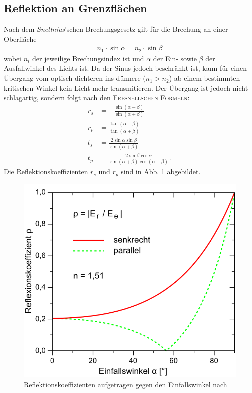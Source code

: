 \documentclass[12pt,a4paper,titlepage,headinclude,bibtotoc]{scrartcl}
\begin{document}
\subsection{Reflektion an Grenzflächen}
Nach dem \textit{Snellnius}'schen Brechungsgesetz gilt für die Brechung an einer Oberfläche
\begin{align}
	n_1\cdot\sin\alpha=n_2\cdot\sin\beta\label{eq:snellnius}
\end{align}
wobei $n_i$ der jeweilige Brechungsindex ist und $\alpha$ der Ein- sowie $\beta$ der Ausfallwinkel des Lichts ist.
Da der Sinus jedoch beschränkt ist, kann für einen Übergang vom optisch dichteren ins dünnere ($n_1 > n_2$) ab einem bestimmten kritischen Winkel kein Licht mehr transmitieren.
Der Übergang ist jedoch nicht schlagartig, sondern folgt nach \cite[S. 238]{demtroeder2} den \textsc{Fresnellschen Formeln}:
\begin{align}
	r_s &= -\frac{\sin (\alpha -\beta )}{\sin ( \alpha + \beta )}\\
	r_p &= \frac{\tan (\alpha - \beta )}{\tan ( \alpha + \beta )}\\
	t_s &= \frac{2\sin\alpha\sin\beta}{\sin (\alpha +\beta )}\\
	t_p &= \frac{2\sin\beta\cos\alpha}{\sin ( \alpha + \beta )\cos(\alpha - \beta)}\, .
\end{align}
Die Reflektionskoeffizienten $r_s$ und $r_p$ sind in Abb. \ref{fig:reflektion} abgebildet.


\begin{figure}[h]
	\centering
	\includegraphics{fresnelkoeff_lp}
	\caption{Reflektionskoeffizienten aufgetragen gegen den Einfallswinkel nach \cite[28.3.2015, 15 Uhr]{lp20}}
	\label{fig:reflektion}
\end{figure}
\end{document}
